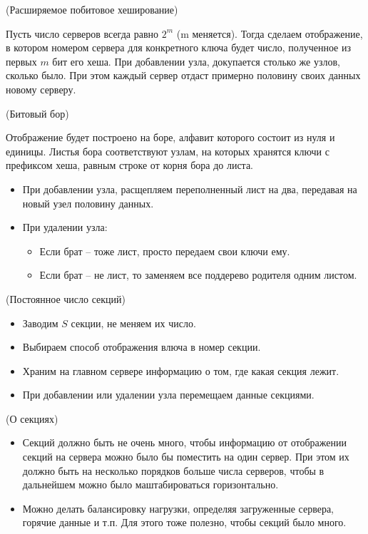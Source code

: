 \begin{algorithm}(Расширяемое побитовое хеширование)

    Пусть число серверов всегда равно $2^m$ (m меняется). Тогда
    сделаем отображение, в котором номером сервера для конкретного ключа
    будет число, полученное из первых $m$ бит его хеша. При добавлении узла,
    докупается столько же узлов, сколько было. При этом каждый сервер отдаст
    примерно половину своих данных новому серверу.
\end{algorithm}

\begin{algorithm}(Битовый бор)

    Отображение будет построено на боре, алфавит которого состоит из нуля и
    единицы. Листья бора соответствуют узлам, на которых хранятся ключи с
    префиксом хеша, равным строке от корня бора до листа.
    \begin{itemize}
        \item При добавлении узла, расщепляем переполненный лист на два,
            передавая на новый узел половину данных.
        \item При удалении узла:
            \begin{itemize}
                \item Если брат -- тоже лист, просто передаем свои ключи ему.
                \item Если брат -- не лист, то заменяем все поддерево родителя
                    одним листом.
            \end{itemize}
    \end{itemize}
\end{algorithm}

\begin{algorithm}(Постоянное число секций)

    \begin{itemize}
        \item Заводим $S$ секции, не меняем их число.
        \item Выбираем способ отображения влюча в номер секции.
        \item Храним на главном сервере информацию о том, где какая секция лежит.
        \item При добавлении или удалении узла перемещаем данные секциями.
    \end{itemize}
\end{algorithm}

\begin{remark}(О секциях)
    \enewline
    \begin{itemize}
        \item Секций должно быть не очень много, чтобы информацию от отображении
            секций на сервера можно было бы поместить на один сервер. При этом
            их должно быть на несколько порядков больше числа серверов,
            чтобы в дальнейшем можно было маштабироваться горизонтально.
        \item Можно делать балансировку нагрузки, определяя загруженные сервера,
            горячие данные и т.п. Для этого тоже полезно, чтобы секций было много.
    \end{itemize}
\end{remark}
